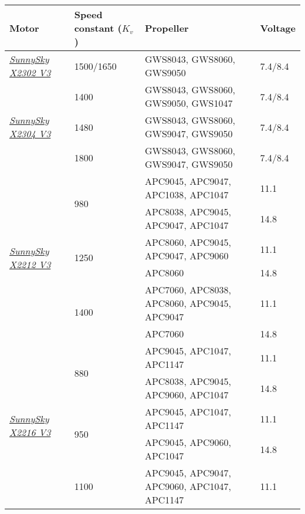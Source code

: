 \begin{table}[H]
	\centering
	\begin{tabularx}{\linewidth}{l l X l}
		\toprule
		\textbf{Motor} & \textbf{Speed constant ($K_v$)} & \textbf{Propeller} & \textbf{Voltage} \\
		\midrule
		\textit{\href{https://sunnyskyusa.com/collections/x-motors/products/sunnysky-x2302}{SunnySky X2302 V3}} & 1500/1650 & {GWS8043}, {GWS8060}, {GWS9050} & {7.4}/{8.4} \\
		\midrule
		\multirow{3}{*}{\textit{\href{https://sunnyskyusa.com/collections/x-motors/products/sunnysky-x2304-v3}{SunnySky X2304 V3}}} & 1400 & {GWS8043}, {GWS8060}, {GWS9050}, {GWS1047} & {7.4}/{8.4} \\
		\cmidrule(l){2-4}
		& 1480 & {GWS8043}, {GWS8060}, {GWS9047}, {GWS9050} & {7.4}/{8.4} \\
		\cmidrule(l){2-4}
		& 1800 & {GWS8043}, {GWS8060}, {GWS9047}, {GWS9050} & {7.4}/{8.4} \\
		\midrule %
		\multirow{6}{*}{\textit{\href{https://sunnyskyusa.com/collections/x-motors/products/sunnsky-x2212}{SunnySky X2212 V3}}} & \multirow{2}{*}{980} & {APC9045}, {APC9047}, {APC1038}, {APC1047} & 11.1 \\
		\cmidrule(l){3-4}
		& & {APC8038}, {APC9045}, {APC9047}, {APC1047} & 14.8 \\
		\cmidrule(l){2-4}
		& \multirow{2}{*}{1250} & {APC8060}, {APC9045}, {APC9047}, {APC9060} & 11.1 \\
		\cmidrule(l){3-4}
		& & {APC8060} & 14.8 \\
		\cmidrule(l){2-4}
		& \multirow{2}{*}{1400} & {APC7060}, {APC8038}, {APC8060}, {APC9045}, {APC9047} & 11.1 \\
		\cmidrule(l){3-4}
		& & {APC7060} & 14.8 \\
		\midrule %
		\multirow{6}{*}{\textit{\href{https://sunnyskyusa.com/collections/x-motors/products/sunnysky-x2216}{SunnySky X2216 V3}}} & \multirow{2}{*}{880} & {APC9045}, {APC1047}, {APC1147} & 11.1 \\
		\cmidrule(l){3-4}
		& & {APC8038}, {APC9045}, {APC9060}, {APC1047} & 14.8 \\
		\cmidrule(l){2-4}
		& \multirow{2}{*}{950} & {APC9045}, {APC1047}, {APC1147} & 11.1 \\
		\cmidrule(l){3-4}
		& & {APC9045}, {APC9060}, {APC1047} & 14.8 \\
		\cmidrule(l){2-4}
		& \multirow{2}{*}{1100} & {APC9045}, {APC9047}, {APC9060}, {APC1047}, {APC1147} & 11.1 \\

\end{tabularx}
\end{table}
